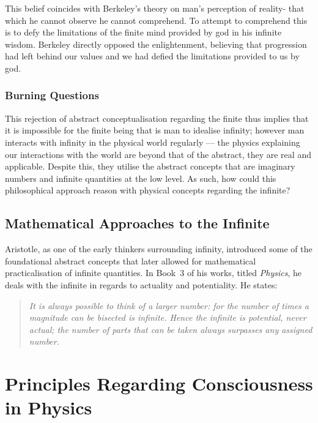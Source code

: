 \documentclass[openany,oneside,12pt,hidelinks]{book}
\begin{document}
This belief coincides with Berkeley's theory on man's perception of reality- that which he cannot observe he cannot comprehend. To attempt to comprehend this is to defy the limitations of the finite mind provided by god in his infinite wisdom. Berkeley directly opposed the enlightenment, believing that progression had left behind our values and we had defied the limitations provided to us by god.

\subsubsection{Burning Questions}

This rejection of abstract conceptualisation regarding the finite thus implies
that it is impossible for the finite being that is man to idealise infinity;
however man interacts with infinity in the physical world regularly --- the
physics explaining our interactions with the world are beyond that of the
abstract, they are real and applicable. Despite this, they utilise the abstract
concepts that are imaginary numbers and infinite quantities at the low level. As
such, how could this philosophical approach reason with physical concepts
regarding the infinite?


\subsection{Mathematical Approaches to the Infinite}

Aristotle, as one of the early thinkers surrounding infinity, introduced some
of the foundational abstract concepts that later allowed for mathematical
practicalisation of infinite quantities. In Book~3 of his works, titled
\emph{Physics}, he deals with the infinite in regards to actuality and
potentiality. He states:
\begin{quote}
  \textit{It is always possible to think of a larger number: for the number of
    times a magnitude can be bisected is infinite. Hence the infinite is
    potential, never actual; the number of parts that can be taken always
    surpasses any assigned number.}
\end{quote}

\newpage

\section{Principles Regarding Consciousness in Physics}
\end{document}
